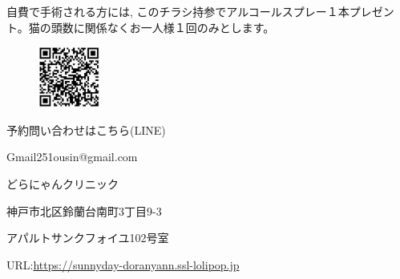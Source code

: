 \documentclass{jsarticle}
\begin{document}
	\vspace{120pt}
	自費で手術される方には, このチラシ持参でアルコールスプレー１本プレゼント。猫の頭数に関係なくお一人様１回のみとします。

	\vspace{20pt}
	\begin{figure}
		\vspace*{-\intextsep}
		\hspace{-60pt}
		\includegraphics[width=2cm]{qr.jpg}
	\end{figure}
	予約問い合わせはこちら(LINE)

	Gmail\hspace{8pt}251ousin@gmail.com

	\vspace{30pt}
	\huge
	どらにゃんクリニック
\Large

	神戸市北区鈴蘭台南町3丁目9-3

	アパルトサンクフォイユ102号室

	URL:\url{https://sunnyday-doranyann.ssl-lolipop.jp}
\end{document}
